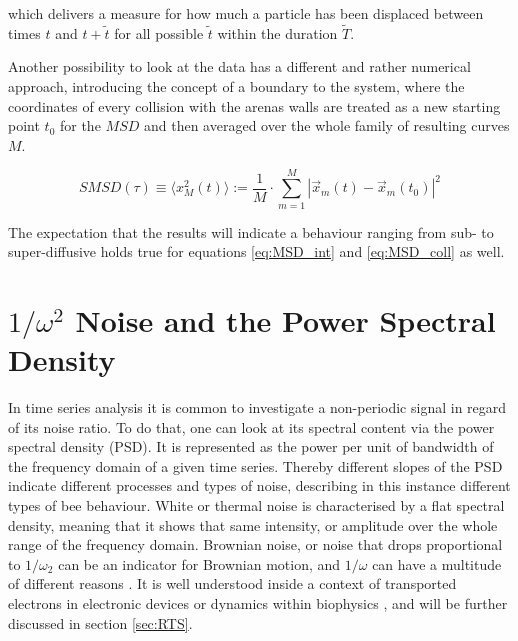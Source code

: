 which delivers a measure for how much a particle has been displaced between times $t$ and $t+\tilde{t}$ for all possible $\tilde{t}$ within the duration $\tilde{T}$.

Another possibility to look at the data has a different and rather numerical approach, introducing the concept of a boundary to the system, where the coordinates of every collision with the arenas walls are treated as a new starting point $t_{0}$ for the $MSD$ and then averaged over the whole family of resulting curves $M$.

\begin{equation}
\label{eq:MSD_coll}
    SMSD(\tau) \equiv \langle x^{2}_M(t) \rangle := \frac{1}{M}\cdot\sum\limits_{m=1}^M|\vec{x}_m(t) - \vec{x}_m(t_{0})|^{2}
\end{equation}

The expectation that the results will indicate a behaviour ranging from sub- to super-diffusive holds true for equations \ref{eq:MSD_int} and \ref{eq:MSD_coll} as well.

\section{$1 / \omega^{2}$ Noise and the Power Spectral Density}
\label{sec:PSD}

In time series analysis it is common to investigate a non-periodic signal in regard of its noise ratio. To do that, one can look at its spectral content via the power spectral density (PSD). It is represented as the power per unit of bandwidth of the frequency domain of a given time series. Thereby different slopes of the PSD indicate different processes and types of noise, describing in this instance different types of bee behaviour. 
White or thermal noise is characterised by a flat spectral density, meaning that it shows that same intensity, or amplitude over the whole range of the frequency domain. Brownian noise, or noise that drops proportional to $1/\omega_{2}$ can be an indicator for Brownian motion, and $1/\omega$ can have a multitude of different reasons \cite{Milotti1995}. It is well understood inside a context of transported electrons in electronic devices or dynamics within biophysics \cite{Dewey1992} \cite{Clay1976}, and will be further discussed in section \ref{sec:RTS}.

